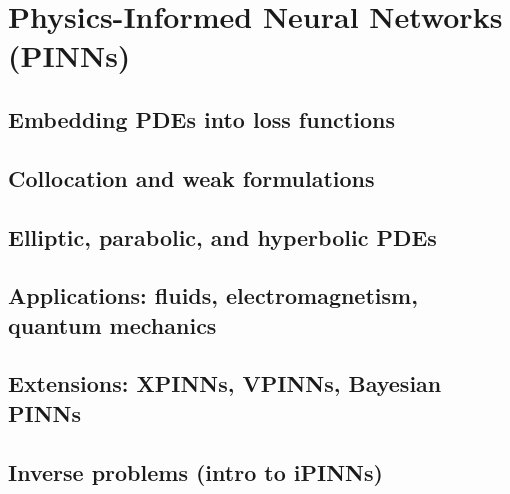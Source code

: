﻿\chapter{Physics-Informed Neural Networks (PINNs)}
\section{Embedding PDEs into loss functions}

\section{Collocation and weak formulations}

\section{Elliptic, parabolic, and hyperbolic PDEs}

\section{Applications: fluids, electromagnetism, quantum mechanics}

\section{Extensions: XPINNs, VPINNs, Bayesian PINNs}

\section{Inverse problems (intro to iPINNs)}



